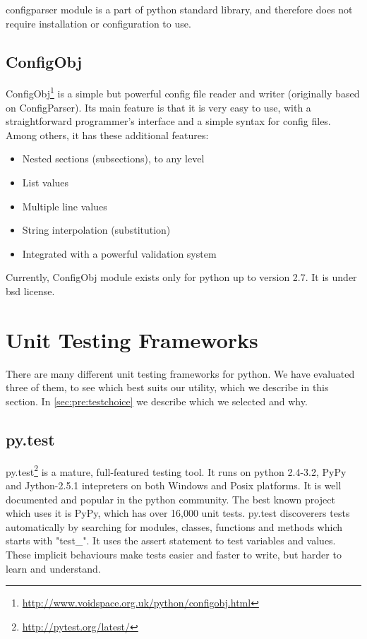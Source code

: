 configparser module is a part of \Gls{python} standard \gls{library}, and therefore does
not require installation or configuration to use.

\subsection{ConfigObj}
ConfigObj\footnote{\url{http://www.voidspace.org.uk/python/configobj.html}} is
a simple but powerful config file reader and writer (originally based on
ConfigParser). Its main feature is that it is very easy to use, with a
straightforward programmer's interface and a simple syntax for config files.
Among others, it has these additional features:
\begin{itemize}
	\item Nested sections (subsections), to any level
	\item List values
	\item Multiple line values
	\item String interpolation (substitution)
	\item Integrated with a powerful validation system
\end{itemize}

\noindent Currently, ConfigObj module exists only for \Gls{python} up to version
2.7. It is under \Gls{bsd} license.


\section{Unit Testing Frameworks}
\label{sec:pre:testing}
There are many different unit testing frameworks for \Gls{python}. We have evaluated
three of them, to see which best suits our \gls{utility}, which we describe in this
section. In \autoref{sec:pre:testchoice} we describe which we selected and why.

\subsection{py.test}
py.test\footnote{\url{http://pytest.org/latest/}} is a mature, full-featured testing
tool. It runs on \Gls{python} 2.4-3.2, PyPy and Jython-2.5.1 intepreters on both
Windows and Posix platforms. It is well documented and popular in the \Gls{python}
community. The best known project which uses it is PyPy, which has over 16,000
unit tests. py.test discoverers tests automatically by searching for modules,
classes, functions and methods which starts with "test\_". It uses the assert
statement to test variables and values. These implicit behaviours make tests
easier and faster to write, but harder to learn and understand.

